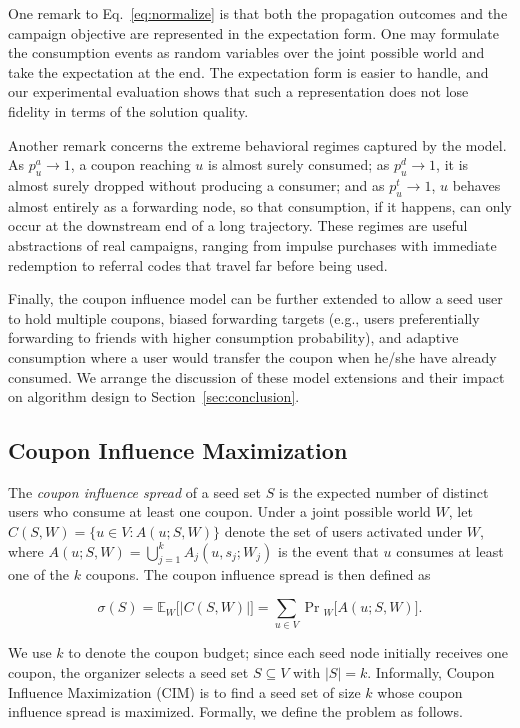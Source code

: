 \documentclass[sigconf]{acmart}
\begin{document}
One remark to Eq.~\eqref{eq:normalize} is that both the propagation
outcomes and the campaign objective are represented in the expectation
form.
One may formulate the consumption events as random variables over the
joint possible world and take the expectation at the end.
The expectation form is easier to handle, and our experimental
evaluation shows that such a representation does not lose fidelity in
terms of the solution quality.

Another remark concerns the extreme behavioral regimes captured by
the model.
As $p_u^a\to 1$, a coupon reaching $u$ is almost surely consumed; as
$p_u^d\to 1$, it is almost surely dropped without producing a
consumer; and as $p_u^t\to 1$, $u$ behaves almost entirely as a
forwarding node, so that consumption, if it happens, can only occur
at the downstream end of a long trajectory.
These regimes are useful abstractions of real campaigns, ranging from
impulse purchases with immediate redemption to referral codes that
travel far before being used.

Finally, the coupon influence model can be further extended to allow
a seed user to hold multiple coupons, biased forwarding targets
(e.g., users preferentially forwarding to friends with higher
consumption probability), and adaptive consumption where a user would transfer the coupon when he/she have already consumed.
We arrange the discussion of these model extensions and their impact
on algorithm design to Section~\ref{sec:conclusion}.

\subsection{Coupon Influence Maximization}

The \emph{coupon influence spread} of a seed set $S$ is the expected
number of distinct users who consume at least one coupon.
Under a joint possible world $W$, let $C(S,W)=\{u\in V : A(u;S,W)\}$
denote the set of users activated under $W$, where
$A(u;S,W)=\bigcup_{j=1}^{k} A_j(u,s_j;W_j)$ is the event that $u$
consumes at least one of the $k$ coupons.
The coupon influence spread is then defined as

\begin{equation}
\label{eq:coupon-spread}
\sigma(S)
=
\mathbb{E}_{W}\bigl[|C(S,W)|\bigr]
=
\sum_{u\in V}
\Pr{}_{W}\bigl[A(u;S,W)\bigr].
\end{equation}

We use $k$ to denote the coupon budget; since each seed node
initially receives one coupon, the organizer selects a seed set
$S\subseteq V$ with $|S|=k$.
Informally, Coupon Influence Maximization (CIM) is to find a seed set
of size $k$ whose coupon influence spread is maximized.
Formally, we define the problem as follows.
\end{document}
